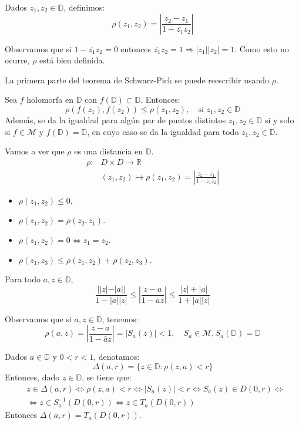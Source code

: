 \begin{definition}
    Dados $z_1, z_2 \in \mathbb{D}$, definimos:
    $$\rho(z_1, z_2) = \left|\frac{z_2-z_1}{1-\overline{z_1}z_2}\right|$$

    Observamos que si $1-\overline{z_1}z_2 = 0$ entonces $\overline{z_1}z_2 = 1 \Rightarrow |z_1||z_2| = 1$.
    Como esto no ocurre, $\rho$ está bien definida.
\end{definition}

La primera parte del teorema de Schwarz-Pick se puede reescribir usando $\rho$.

Sea $f$ holomorfa en $\mathbb{D}$ con $f(\mathbb{D}) \subset \mathbb{D}$.
Entonces:
$$\rho(f(z_1), f(z_2)) \leq \rho(z_1, z_2), \quad \text{si } z_1, z_2 \in \mathbb{D}$$
Además, se da la igualdad para algún par de puntos distintos $z_1, z_2 \in \mathbb{D}$ si y solo si $f \in \mathcal{M}$ y $f(\mathbb{D}) = \mathbb{D}$, en cuyo caso se da la igualdad para todo $z_1, z_2 \in \mathbb{D}$.

Vamos a ver que $\rho$ es una distancia en $\mathbb{D}$.
\begin{align*}
    \rho: & D \times D \to \mathbb{R}                                                            \\
          & (z_1, z_2) \mapsto \rho(z_1, z_2) = \left|\frac{z_2-z_1}{1-\overline{z_1}z_2}\right|
\end{align*}

\begin{itemize}
    \item $\rho(z_1, z_2) \leq 0$.
    \item $\rho(z_1, z_2) = \rho(z_2, z_1)$.
    \item $\rho(z_1, z_2) = 0 \Leftrightarrow z_1 = z_2$.
    \item $\rho(z_1, z_3) \leq \rho(z_1, z_2) + \rho(z_2, z_3)$.
\end{itemize}

\begin{lemma}
    Para todo $a, z \in \mathbb{D}$,
    $$\frac{||z|-|a||}{1-|a||z|} \leq \left|\frac{z-a}{1-\bar{a}z}\right| \leq \frac{|z|+|a|}{1+|a||z|}$$
\end{lemma}

Observamos que si $a, z \in \mathbb{D}$, tenemos:
$$\rho(a, z) = \left|\frac{z-a}{1-\bar{a}z}\right| = |S_a(z)| < 1, \quad S_a \in \mathcal{M}, S_a(\mathbb{D}) = \mathbb{D}$$

Dados $a \in \mathbb{D}$ y $0 < r < 1$, denotamos:
$$\Delta(a, r) = \{z \in \mathbb{D} : \rho(z, a) < r\}$$
Entonces, dado $z \in \mathbb{D}$, se tiene que:
\begin{align*}
     & z \in \Delta(a, r) \Leftrightarrow \rho(z, a) < r \Leftrightarrow |S_a(z)| < r \Leftrightarrow S_a(z) \in D(0, r) \Leftrightarrow \\
     & \Leftrightarrow z \in S_a^{-1}(D(0, r)) \Leftrightarrow z \in T_a(D(0, r))
\end{align*}
Entonces $\Delta(a, r) = T_a(D(0, r))$.